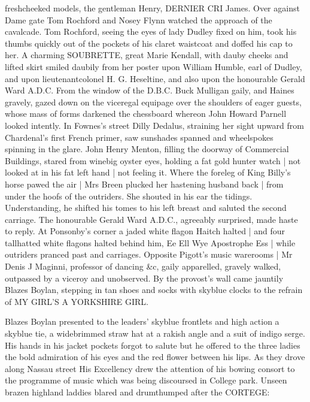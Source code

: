freshcheeked models,
the gentleman Henry,
DERNIER CRI James.
Over against Dame gate
Tom Rochford and Nosey Flynn
watched the approach of the cavalcade.
Tom Rochford,
seeing the eyes of lady Dudley fixed on him,
took his thumbs quickly
out of the pockets of his claret waistcoat and
doffed his cap to her.
A charming SOUBRETTE, great Marie Kendall,
with dauby cheeks and lifted skirt
smiled daubily from her poster
upon William Humble, earl of Dudley,
and upon lieutenantcolonel H. G. Heseltine,
and also upon the honourable Gerald Ward A.D.C.
From the window of the D.B.C.
Buck Mulligan gaily,
and Haines gravely,
gazed down on the
viceregal equipage
over the shoulders of eager guests,
whose mass of forms
darkened the chessboard
whereon John Howard Parnell looked intently.
In
Fownes's street
Dilly Dedalus,
straining her sight upward from
Chardenal's first French primer,
saw sunshades spanned and wheelspokes
spinning in the glare.
John Henry Menton,
filling the doorway of Commercial Buildings,
stared from winebig oyster eyes,
holding a fat gold hunter watch |
not looked at in his fat left hand |
not feeling it.
Where the foreleg of King Billy's horse pawed the air |
Mrs Breen plucked her hastening husband back |
from under the hoofs of the outriders.
She shouted in his ear
the tidings.
Understanding, he shifted his tomes to his left
breast
and saluted the second carriage.
The honourable Gerald Ward A.D.C.,
agreeably surprised,
made haste to reply.
At Ponsonby's corner
a jaded
white flagon Haitch \stage{[H.]} halted |
and four tallhatted white flagons halted behind him,
Ee Ell Wye Apostrophe Ess \stage{[E.L.Y.'S]} |
while outriders pranced past
and carriages.
Opposite Pigott's music warerooms |
Mr Denis J Maginni,
professor of dancing \&c,
gaily apparelled,
gravely walked,
outpassed by a viceroy and unobserved.
By the provost's wall
came jauntily Blazes Boylan,
stepping in tan shoes
and socks with skyblue clocks
to the refrain of
MY GIRL'S A YORKSHIRE GIRL.

Blazes Boylan presented to the leaders'
skyblue frontlets and high
action a skyblue tie,
a widebrimmed straw hat at a rakish angle
and a suit
of indigo serge.
His hands in his jacket pockets
forgot to salute but he
offered to the three ladies
the bold admiration of his eyes
and the red
flower between his lips.
As they drove along Nassau street
His Excellency
drew the attention of his bowing consort
to the programme of music
which
was being discoursed in College park.
Unseen brazen highland laddies
blared and drumthumped
after the CORTEGE:%


